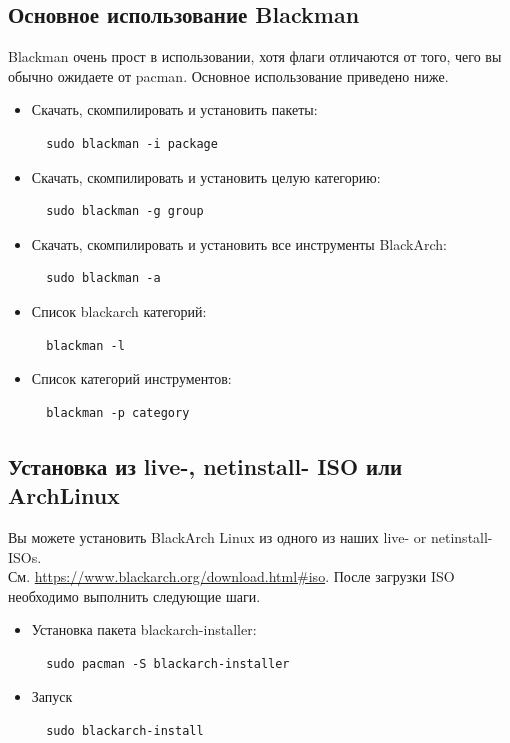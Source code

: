 \documentclass[a4paper, oneside, 11pt]{book}
\begin{document}
\subsection{Основное использование Blackman} Blackman очень прост в использовании, хотя флаги отличаются от того, 
чего вы обычно ожидаете от pacman. Основное использование приведено ниже.
\begin{itemize}
\item Скачать, скомпилировать и установить пакеты:
\begin{lstlisting}
  sudo blackman -i package
\end{lstlisting}

\item Скачать, скомпилировать и установить целую категорию:
\begin{lstlisting}
  sudo blackman -g group
\end{lstlisting}

\item Скачать, скомпилировать и установить все инструменты BlackArch:
\begin{lstlisting}
  sudo blackman -a
\end{lstlisting}

\item Список blackarch категорий:
\begin{lstlisting}
  blackman -l
\end{lstlisting}

\item Список категорий инструментов:
\begin{lstlisting}
  blackman -p category
\end{lstlisting}

\end{itemize}

\subsection{Установка из live-, netinstall- ISO или ArchLinux}
Вы можете установить BlackArch Linux из одного из наших live- or netinstall- ISOs.\\См.
\url{https://www.blackarch.org/download.html#iso}. После загрузки ISO необходимо выполнить следующие шаги.
\begin{itemize}
\item Установка пакета blackarch-installer:
\begin{lstlisting}
  sudo pacman -S blackarch-installer
\end{lstlisting}

\item Запуск
\begin{lstlisting}
  sudo blackarch-install
\end{lstlisting}

\end{itemize}
\end{document}
